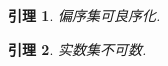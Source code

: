 \documentclass[nofonts]{ctexart}
\newcounter{chapter}
\newtheorem{lemma}{引理}[chapter] %
\begin{document}
\begin{lemma} 偏序集可良序化. \end{lemma}
\begin{lemma} 实数集不可数. \end{lemma}
\end{document}
